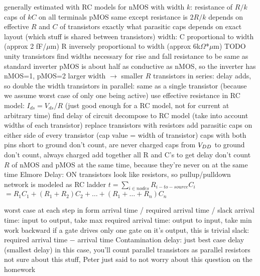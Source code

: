 \documentclass[12pt]{article}
\begin{document}
\begin{spacing}{0.8}
\begin{multicols*}{2}
\begin{flushleft}
\begin{outline}[longenum]
  \1 generally estimated with RC models
    \2 for nMOS with width $k$:
    \2 resistance of $R/k$
    \2 caps of $kC$ on all terminals
    \2 pMOS same except resistance is $2R/k$
  \1 depends on effective $R$ and $C$ of transistors 
    \2 exactly what parasitic caps depends on exact layout (which stuff is shared between transistors)
  \1 width:
    \2 C proportional to width
     (approx 2 fF/$\mu$m)
    \2 R inversely proportional to width
      (approx 6k$\Omega$*$\mu$m)
    \2 TODO unity transistors
  \1 find widths necessary for rise and fall resistance to be same as standard inverter
    \2 pMOS is about half as conductive as nMOS, so the inverter has nMOS=1, pMOS=2
    \2 larger width $\rightarrow$ smaller $R$
    \2 transistors in series: delay adds, so double the width
    \2 transistors in parallel: same as a single transistor (because we assume worst case of only one being active)
  \1 use effective resistance in RC model: $I_{ds}=V_{ds}/R$
    (just good enough for a RC model, not for current at arbitrary time)
  \1 find delay of circuit
    \2 decompose to RC model (take into account widths of each transistor)
      \3 replace transistors with resistors
      \3 add parasitic caps on either side of every transistor (cap value = width of transistor)
        \4 caps with both pins short to ground don't count, are never charged
        \4 caps from $V_{DD}$ to ground don't count, always charged
    \2 add together all R and C's to get delay
      \3 don't count $R$ of nMOS and pMOS at the same time, because they're never on at the same time
  \1 Elmore Delay:
    \2 ON transistors look like resistors, so pullup/pulldown network is modeled as RC ladder
    \2 $t = \sum_{i\in nodes} R_{i-to-source}C_i$
    $= R_1C_1 + (R_1+R_2)C_2+\ldots+(R_1+\ldots+R_n)C_n$

  \1 worst case at each step
  \1 in form arrival time / required arrival time / slack
  \1 arrival time: input to output, take max
  \1 required arrival time: output to input, take min
    \2 work backward
    \2 if a gate drives only one gate on it's output, this is trivial
  \1 slack: required arrival time $-$ arrival time
  \1 Contamination delay: just best case delay (smallest delay)
    \2 in this case, you'll count parallel transistors as parallel resistors
  \1 not sure about this stuff, Peter just said to not worry about this question on the homework


\end{outline}
\end{flushleft}
\end{multicols*}
\end{spacing}
\end{document}
